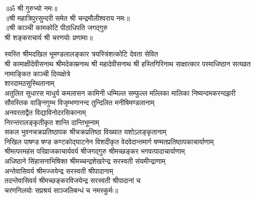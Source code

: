 \begin{center}
{॥ॐ श्री गुरुभ्यो नमः॥}\\
{॥श्री महात्रिपुरसुन्दरी समेत श्री चन्द्रमौलीश्वराय नमः॥}\\
{॥श्री काञ्ची कामकोटि पीठाधिपति जगद्गुरु\\ श्री शङ्कराचार्य श्री चरणयोः प्रणामाः॥}
\end{center}

\noindent स्वस्ति श्रीमदखिल भूमण्डलालङ्कार त्रयस्त्रिंशत्कोटि देवता सेवित\\
 श्री कामाक्षीदेवीसनाथ श्रीमदेकाम्रनाथ श्री महादेवीसनाथ श्री हस्तिगिरिनाथ साक्षात्कार परमाधिष्ठान सत्यव्रत नामाङ्कित काञ्ची दिव्यक्षेत्रे\\
 शारदामठसुस्थितानाम्\\
 अतुलित सुधारस माधुर्य कमलासन कामिनी धम्मिल्ल सम्फुल्ल मल्लिका मालिका
निष्यन्दमकरन्दझरी सौवस्तिक वाङ्निगुम्भ विजृम्भणानन्द 
तुन्दिलित मनीषिमण्डलानाम्\\
 अनवरताद्वैत विद्याविनोदरसिकानाम्\\
 निरन्तरालङ्कृतीकृत शान्ति दान्तिभूम्नाम्\\
 सकल भुवनचक्रप्रतिष्ठापक  श्रीचक्रप्रतिष्ठा विख्यात यशोऽलङ्कृतानाम्\\
 निखिल पाषण्ड षण्ड कण्टकोद्घाटनेन विशदीकृत वेदवेदान्तमार्ग
षण्मत\-प्रतिष्ठापकाचार्याणाम्\\
 श्रीमत्परमहंस परिव्राजकाचार्यवर्य श्रीजगद्गुरु श्रीमच्छङ्कर भगवत्पादाचार्याणाम्\\
 अधिष्ठाने सिंहासनाभिषिक्त श्रीमच्चन्द्रशेखरेन्द्र सरस्वती संयमीन्द्राणाम्\\
 अन्तेवासिवर्य श्रीमज्जयेन्द्र सरस्वती श्रीपादानाम्\\
 तदन्तेवासिवर्य श्रीमच्छङ्करविजयेन्द्र सरस्वती श्रीपादानां च\\
 चरणनिलयोः सप्रश्रयं साञ्जलिबन्धं च नमस्कुर्मः॥